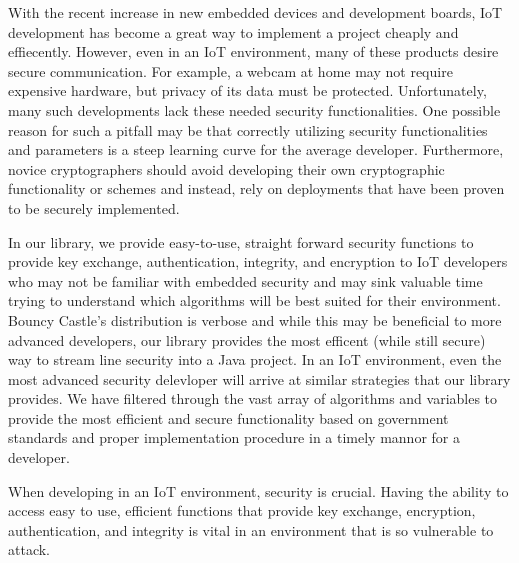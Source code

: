 With the recent increase in new embedded devices and development boards, IoT development has become a great way to implement a project cheaply and effiecently. However, even in an IoT environment, many of these products desire secure communication. For example, a webcam at home may not require expensive hardware, but privacy of its data must be protected. Unfortunately, many such developments lack these needed security functionalities. One possible reason for such a pitfall may be that correctly utilizing security functionalities and parameters is a steep learning curve for the average developer. Furthermore, novice cryptographers should avoid developing their own cryptographic functionality or schemes and instead, rely on deployments that have been proven to be securely implemented. 

In our library, we provide easy-to-use, straight forward security functions to provide key exchange, authentication, integrity, and encryption to IoT developers who may not be familiar with embedded security and may sink valuable time trying to understand which algorithms will be best suited for their environment. Bouncy Castle's distribution is verbose and while this may be beneficial to more advanced developers, our library provides the most efficent (while still secure) way to stream line security into a Java project. In an IoT environment, even the most advanced security delevloper will arrive at similar strategies that our library provides. We have filtered through the vast array of algorithms and variables to provide the most efficient and secure functionality based on government standards and proper implementation procedure in a timely mannor for a developer. 

When developing in an IoT environment, security is crucial. Having the ability to access easy to use, efficient functions that provide key exchange, encryption, authentication, and integrity is vital in an environment that is so vulnerable to attack.